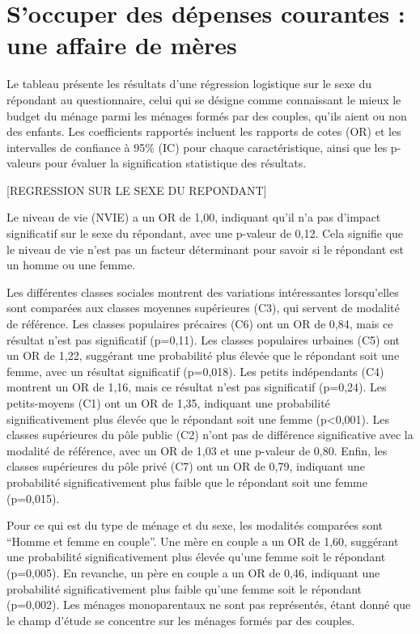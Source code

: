 \documentclass[
  12pt,
]{book}
\begin{document}
\section{S'occuper des dépenses courantes : une affaire de
mères}\label{soccuper-des-duxe9penses-courantes-une-affaire-de-muxe8res}

Le tableau présente les résultats d'une régression logistique sur le
sexe du répondant au questionnaire, celui qui se désigne comme
connaissant le mieux le budget du ménage parmi les ménages formés par
des couples, qu'ils aient ou non des enfants. Les coefficients rapportés
incluent les rapports de cotes (OR) et les intervalles de confiance à
95\% (IC) pour chaque caractéristique, ainsi que les p-valeurs pour
évaluer la signification statistique des résultats.

{[}REGRESSION SUR LE SEXE DU REPONDANT{]}

Le niveau de vie (NVIE) a un OR de 1,00, indiquant qu'il n'a pas
d'impact significatif sur le sexe du répondant, avec une p-valeur de
0,12. Cela signifie que le niveau de vie n'est pas un facteur
déterminant pour savoir si le répondant est un homme ou une femme.

Les différentes classes sociales montrent des variations intéressantes
lorsqu'elles sont comparées aux classes moyennes supérieures (C3), qui
servent de modalité de référence. Les classes populaires précaires (C6)
ont un OR de 0,84, mais ce résultat n'est pas significatif (p=0,11). Les
classes populaires urbaines (C5) ont un OR de 1,22, suggérant une
probabilité plus élevée que le répondant soit une femme, avec un
résultat significatif (p=0,018). Les petits indépendants (C4) montrent
un OR de 1,16, mais ce résultat n'est pas significatif (p=0,24). Les
petits-moyens (C1) ont un OR de 1,35, indiquant une probabilité
significativement plus élevée que le répondant soit une femme
(p\textless0,001). Les classes supérieures du pôle public (C2) n'ont pas
de différence significative avec la modalité de référence, avec un OR de
1,03 et une p-valeur de 0,80. Enfin, les classes supérieures du pôle
privé (C7) ont un OR de 0,79, indiquant une probabilité
significativement plus faible que le répondant soit une femme (p=0,015).

Pour ce qui est du type de ménage et du sexe, les modalités comparées
sont ``Homme et femme en couple''. Une mère en couple a un OR de 1,60,
suggérant une probabilité significativement plus élevée qu'une femme
soit le répondant (p=0,005). En revanche, un père en couple a un OR de
0,46, indiquant une probabilité significativement plus faible qu'une
femme soit le répondant (p=0,002). Les ménages monoparentaux ne sont pas
représentés, étant donné que le champ d'étude se concentre sur les
ménages formés par des couples.
\end{document}
